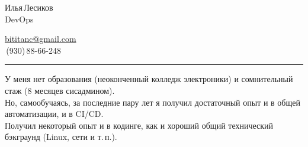 \documentclass[10pt, a4paper]{article}
\begin{document}


{\setlength\multicolsep{0pt}%
\begin{multicols}{2}





\begin{spacing}{1.5}
  {\LARGE Илья\,Лесиков}\\
  {\large DevOps}\hspace{1.3cm}{\large 25\,лет}\\
\end{spacing}

\columnbreak

\begin{flushright}
  \begin{spacing}{1.3}
    {\large \href{mailto:bititanc@gmail.com}{bititanc@gmail.com}}\\
    \fontsize{1.4em}{0}\,(930)\,88-66-248 \normalsize\\
  \end{spacing}
\end{flushright}

\end{multicols}
}

\vspace{-10pt}
\textcolor[RGB]{220,220,220}{\rule{\linewidth}{0.2pt}}
\vspace{5pt}

У меня нет образования (неоконченный колледж электроники) и сомнительный стаж (8 месяцев сисадмином).\\
Но, самообучаясь, за последние пару лет я получил достаточный опыт и в общей автоматизации, и в CI/CD.\\
Получил некоторый опыт и в кодинге, как и хороший общий технический бэкграунд (Linux, сети и т.\,п.).
\end{document}
